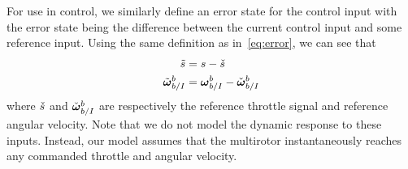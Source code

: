 For use in control, we similarly define an error state for the control input
with the error state being the difference between the current control input and
some reference input.
Using the same definition as in~\eqref{eq:error}, we can see that
\begin{align}
  \tilde{s} &= s - \check{s} \\
  \tilde{\boldsymbol{\mathrm{\omega}}}_{b/I}^{b} &= \boldsymbol{\mathrm{\omega}}_{b/I}^{b} - \check{\boldsymbol{\mathrm{\omega}}}_{b/I}^{b}
  \label{eq:input_error_state}
\end{align}
where $\check{s}$ and $\check{\boldsymbol{\mathrm{\omega}}}_{b/I}^{b}$ are respectively the reference throttle
signal and reference angular velocity. Note that we do not model the dynamic
response to these inputs. Instead, our model assumes that the multirotor
instantaneously reaches any commanded throttle and angular velocity.

